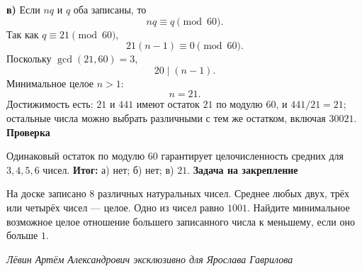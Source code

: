 \documentclass[12pt,a4paper]{article}
\newcommand{\finalnote}[1]{\textcolor{teal!60!black}{\textbf{Итог:}} #1}
\newcommand{\subhead}[1]{\vspace{0.2em}\textbf{#1}\par}
\begin{document}
\textbf{в)}
Если $nq$ и $q$ оба записаны, то
\[
nq\equiv q\pmod{60}.
\]
Так как $q\equiv21\pmod{60}$,
\[
21(n-1)\equiv0\pmod{60}.
\]
Поскольку $\gcd(21,60)=3$,
\[
20\mid(n-1).
\]
Минимальное целое $n>1$:
\[
n=21.
\]
Достижимость есть: $21$ и $441$ имеют остаток $21$ по модулю $60$, и $441/21=21$; остальные числа можно выбрать различными с тем же остатком, включая $30021$.
\subhead{Проверка}
Одинаковый остаток по модулю $60$ гарантирует целочисленность средних для $3,4,5,6$ чисел.
\finalnote{а) нет; б) нет; в) $21$.}
\subhead{Задача на закрепление}
На доске записано $8$ различных натуральных чисел. Среднее любых двух, трёх или четырёх чисел --- целое. Одно из чисел равно $1001$. Найдите минимальное возможное целое отношение большего записанного числа к меньшему, если оно больше $1$.

\vfill
\begin{center}
\textit{Лёвин Артём Александрович эксклюзивно для Ярослава Гаврилова}
\end{center}
\end{document}
